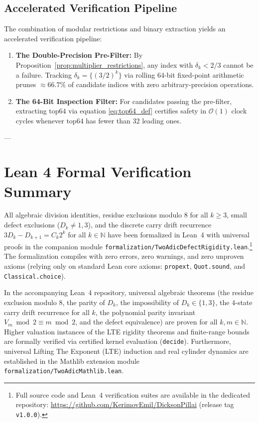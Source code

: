 \documentclass[11pt,reqno]{amsart}
\theoremstyle{definition}
\numberwithin{equation}{section}
\begin{document}
\subsection{Accelerated Verification Pipeline}
The combination of modular restrictions and binary extraction yields an accelerated verification pipeline:
\begin{enumerate}
    \item \textbf{The Double-Precision Pre-Filter:} By Proposition~\ref{prop:multiplier_restrictions}, any index with $\delta_k < 2/3$ cannot be a failure. Tracking $\delta_k = \{(3/2)^k\}$ via rolling 64-bit fixed-point arithmetic prunes $\approx 66.7\%$ of candidate indices with zero arbitrary-precision operations.
    \item \textbf{The 64-Bit Inspection Filter:} For candidates passing the pre-filter, extracting $\mathrm{top64}$ via equation \eqref{eq:top64_def} certifies safety in $\mathcal{O}(1)$ clock cycles whenever $\mathrm{top64}$ has fewer than 32 leading ones.
\end{enumerate}

---

\section{Lean 4 Formal Verification Summary}

All algebraic division identities, residue exclusions modulo $8$ for all $k \ge 3$, small defect exclusions ($D_k \ne 1, 3$), and the discrete carry drift recurrence $3 D_k - D_{k+1} = C_k 2^k$ for all $k \in \mathbb{N}$ have been formalized in Lean~4 with universal proofs in the companion module \nolinkurl{formalization/TwoAdicDefectRigidity.lean}.\footnote{Full source code and Lean~4 verification suites are available in the dedicated repository: \url{https://github.com/KerimovEmil/DicksonPillai} (release tag \texttt{v1.0.0}).}
The formalization compiles with zero errors, zero warnings, and zero unproven axioms (relying only on standard Lean core axioms: \texttt{propext}, \texttt{Quot.sound}, and \texttt{Classical.choice}).

In the accompanying Lean~4 repository, universal algebraic theorems (the residue exclusion modulo $8$, the parity of $D_k$, the impossibility of $D_k \in \{1, 3\}$, the 4-state carry drift recurrence for all $k$, the polynomial parity invariant $V_m \bmod 2 \equiv m \bmod 2$, and the defect equivalence) are proven for all $k, m \in \mathbb{N}$. Higher valuation instances of the LTE rigidity theorems and finite-range bounds are formally verified via certified kernel evaluation (\texttt{decide}). Furthermore, universal Lifting The Exponent (LTE) induction and real cylinder dynamics are established in the Mathlib extension module \nolinkurl{formalization/TwoAdicMathlib.lean}.
\end{document}
